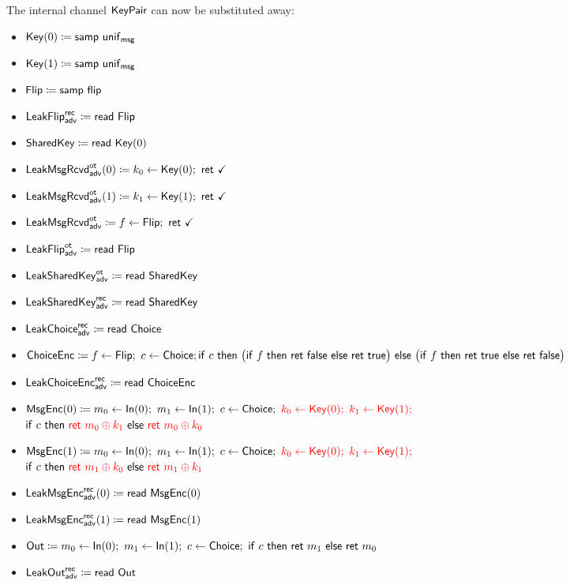 \noindent The internal channel $\mathsf{KeyPair}$ can now be substituted away:

\begin{itemize}
\item $\mathsf{Key}(0) \coloneqq \mathsf{samp} \ \mathsf{unif}_{\mathsf{msg}}$
\item $\mathsf{Key}(1) \coloneqq \mathsf{samp} \ \mathsf{unif}_{\mathsf{msg}}$
\item $\mathsf{Flip} \coloneqq \mathsf{samp} \ \mathsf{flip}$
\item {\color{blue} $\mathsf{LeakFlip}^{\mathsf{rec}}_{\mathsf{adv}} \coloneqq \mathsf{read} \ \mathsf{Flip}$}
\item {\color{red} $\mathsf{SharedKey} \coloneqq \mathsf{read} \ \mathsf{Key}(0)$}
\item {\color{blue} $\LeakKeyRcvd^\ot_\adv(0) \coloneqq k_0 \leftarrow \Key(0); \ \ret{\checkmark}$}
\item {\color{blue} $\LeakKeyRcvd^\ot_\adv(1) \coloneqq k_1 \leftarrow \Key(1); \ \ret{\checkmark}$}
\item {\color{blue} $\mathsf{LeakMsgRcvd}^{\mathsf{ot}}_{\mathsf{adv}} \coloneqq f \leftarrow \mathsf{Flip}; \ \mathsf{ret} \ \checkmark$}
\item {\color{blue} $\mathsf{LeakFlip}^{\mathsf{ot}}_{\mathsf{adv}} \coloneqq \mathsf{read} \ \mathsf{Flip}$}
\item {\color{blue} $\mathsf{LeakSharedKey}^{\mathsf{ot}}_{\mathsf{adv}} \coloneqq \mathsf{read} \ \mathsf{SharedKey}$}
\item {\color{blue} $\mathsf{LeakSharedKey}^{\mathsf{rec}}_{\mathsf{adv}} \coloneqq \mathsf{read} \ \mathsf{SharedKey}$}
\item {\color{blue} $\mathsf{LeakChoice}^{\mathsf{rec}}_{\mathsf{adv}} \coloneqq \mathsf{read} \ \mathsf{Choice}$}
\item $\mathsf{ChoiceEnc} \coloneqq f \leftarrow \mathsf{Flip}; \ c \leftarrow \mathsf{Choice}; \\ \mathsf{if} \ c \ \mathsf{then} \ \big(\mathsf{if} \ f \ \mathsf{then} \ \mathsf{ret} \ \mathsf{false} \ \mathsf{else} \ \mathsf{ret} \ \mathsf{true}\big) \ \mathsf{else} \ \big(\mathsf{if} \ f \ \mathsf{then} \ \mathsf{ret} \ \mathsf{true} \ \mathsf{else} \ \mathsf{ret} \ \mathsf{false}\big)$
\item {\color{blue} $\mathsf{LeakChoiceEnc}^{\mathsf{rec}}_{\mathsf{adv}} \coloneqq \mathsf{read} \ \mathsf{ChoiceEnc}$}
\item $\mathsf{MsgEnc}(0) \coloneqq m_0 \leftarrow \mathsf{In}(0); \ m_1 \leftarrow \mathsf{In}(1); \ c \leftarrow \mathsf{Choice}; \ {\color{red} k_0 \leftarrow \mathsf{Key}(0); \ k_1 \leftarrow \mathsf{Key}(1);}$ \\ $\mathsf{if} \ c \ \mathsf{then} \ {\color{red} \mathsf{ret} \ m_0 \oplus k_1} \ \mathsf{else} \ {\color{red} \mathsf{ret} \ m_0 \oplus k_0}$
\item $\mathsf{MsgEnc}(1) \coloneqq m_0 \leftarrow \mathsf{In}(0); \ m_1 \leftarrow \mathsf{In}(1); \ c \leftarrow \mathsf{Choice}; \ {\color{red} k_0 \leftarrow \mathsf{Key}(0); \ k_1 \leftarrow \mathsf{Key}(1);}$ \\ $\mathsf{if} \ c \ \mathsf{then} \ {\color{red} \mathsf{ret} \ m_1 \oplus k_0} \ \mathsf{else} \ {\color{red} \mathsf{ret} \ m_1 \oplus k_1}$
\item {\color{blue} $\mathsf{LeakMsgEnc}^{\mathsf{rec}}_{\mathsf{adv}}(0) \coloneqq \mathsf{read} \ \mathsf{MsgEnc}(0)$}
\item {\color{blue} $\mathsf{LeakMsgEnc}^{\mathsf{rec}}_{\mathsf{adv}}(1) \coloneqq \mathsf{read} \ \mathsf{MsgEnc}(1)$}
\item $\Out \coloneqq m_0 \leftarrow \In(0); \ m_1 \leftarrow \In(1); \ c \leftarrow \Choice; \ \ifte{c}{\ret{m_1}}{\ret{m_0}}$
\item {\color{blue} $\mathsf{LeakOut}^{\mathsf{rec}}_{\mathsf{adv}} \coloneqq \mathsf{read} \ \mathsf{Out}$}
\end{itemize}

